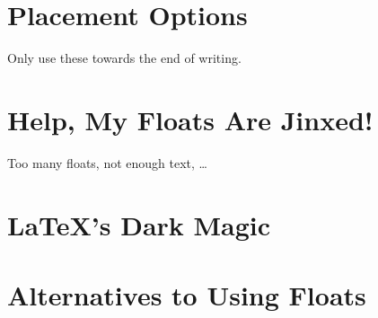 \documentclass[article,a4paper,oneside,10pt]{memoir}
\begin{document}
\chapter{Placement Options}
\label{chap:placement}

Only use these towards the end of writing.

\chapter{Help, My Floats Are Jinxed!}
\label{chap:jinxed}

Too many floats, not enough text, \ldots


\chapter{\LaTeX's Dark Magic}
\label{chap:innards}


\chapter{Alternatives to Using Floats}
\label{chap:alternatives}
\end{document}
